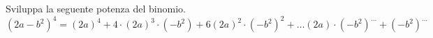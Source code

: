 
\subsubsection*{}

\begin{esercizio}
 \label{ese:11.28}
 Sviluppa la seguente potenza del binomio.
 \[\left(2a-b^{2}\right)^{4}=\left(2a\right)^{4}+4\cdot
\left(2a\right)^{3}\cdot \left(-b^{2}\right)+6\left(2a\right)^{2}\cdot
\left(-b^{2}\right)^{2}+\ldots \left(2a\right)\cdot
\left(-b^{2}\right)^{\ldots }+\left(-b^{2}\right)^{\ldots }\]
\end{esercizio}

